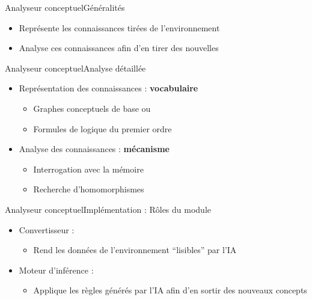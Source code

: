 \begin{frame}{Analyseur conceptuel}{Généralités}
\begin{itemize}
  \item Représente les connaissances tirées de l'environnement
  \item Analyse ces connaissances afin d'en tirer des nouvelles
\end{itemize}
\end{frame}

\begin{frame}{Analyseur conceptuel}{Analyse détaillée}
\begin{itemize}
  \item Représentation des connaissances : \textbf{vocabulaire}
  \begin{itemize}
    \item Graphes conceptuels de base ou
    \item Formules de logique du premier ordre
  \end{itemize}
  \item Analyse des connaissances : \textbf{mécanisme}
  \begin{itemize}
    \item Interrogation avec la mémoire
    \item Recherche d'homomorphismes
  \end{itemize}
\end{itemize}
\end{frame}

\begin{frame}{Analyseur conceptuel}{Implémentation : Rôles du module}
\begin{itemize}
  \item Convertisseur :
  \begin{itemize}
    \item Rend les données de l'environnement \enquote{lisibles} par l'IA
  \end{itemize}
  \item Moteur d'inférence :
  \begin{itemize}
    \item Applique les règles générés par l'IA afin d'en
    sortir des nouveaux concepts
  \end{itemize}
\end{itemize}
\end{frame}


